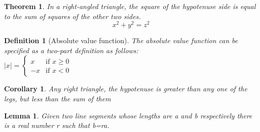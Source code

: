 \documentclass{article}
\newtheorem{theorem}{Theorem}
\newtheorem{corollary}{Corollary}
\newtheorem{lemma}{Lemma}
\newtheorem{definition}{Definition}
\begin{document}
	\begin{theorem}
		In a right-angled triangle, the square of the hypotenuse side is equal to the sum
		of squares of the other two sides.
		\[ x^2 + y^2 = z^2 \]
	\end{theorem}
	\begin{definition}[Absolute value function]
		The absolute value function can be specified as a two-part definition as
		follows: \\
		$
		|x| =
		\left\{
		\begin{array}{ll}
			x & \mbox{if } x \geq 0 \\
			-x & \mbox{if } x < 0
		\end{array}
		\right.
		$
	\end{definition}
\begin{corollary}
	Any right triangle, the hypotenuse is greater than any one of the legs, but less
	than the sum of them
\end{corollary}
\begin{lemma}
	Given two line segments whose lengths are a and b respectively there is a real
	number r such that b=ra.
\end{lemma}
\end{document}
